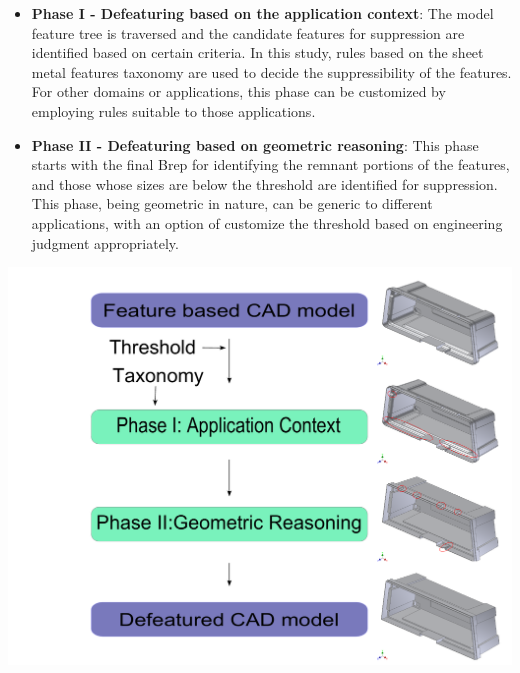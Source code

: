 \begin{minipage}[c]{0.58\linewidth}
\begin{itemize}
[noitemsep,topsep=2pt,parsep=2pt,partopsep=2pt,leftmargin=*]
\item \textbf{Phase I - Defeaturing based on the application context}: The model feature tree is traversed and the candidate features for suppression are identified based on certain criteria. In this study, rules based on the sheet metal features taxonomy are used to decide the suppressibility of the features. For other domains or applications, this phase can be customized by employing rules suitable to those applications.

\item \textbf{Phase II - Defeaturing based on geometric reasoning}: This phase starts with the final Brep for identifying the remnant portions of the features, and those whose sizes are below the threshold are identified for suppression. This phase, being geometric in nature, can be generic to different applications, with an option of customize the threshold based on engineering judgment appropriately.
\end{itemize}
    \end{minipage}
    \hfill
    \begin{minipage}[c]{0.4\linewidth}
        \centering
        \includegraphics[width=\linewidth]{../Common/images/SystemArchitectureDefeat_1}
        \label{fig:label}
    \end{minipage}

